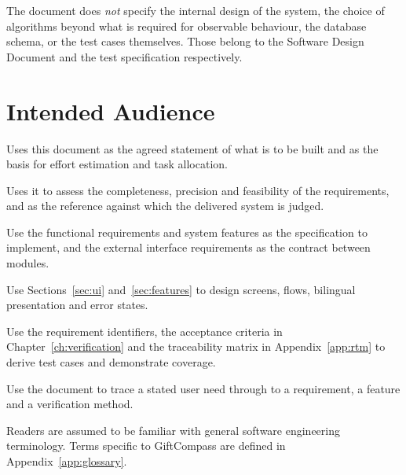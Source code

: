 \documentclass[11pt,a4paper]{report}
\begin{document}
\noindent The document does \emph{not} specify the internal design of the system, the choice
of algorithms beyond what is required for observable behaviour, the database schema, or the
test cases themselves. Those belong to the Software Design Document and the test
specification respectively.

\section{Intended Audience}
\begin{description}[style=nextline,leftmargin=0pt]
  \item[Project team] Uses this document as the agreed statement of what is to be built and
        as the basis for effort estimation and task allocation.
  \item[Instructor and project supervisor] Uses it to assess the completeness, precision and
        feasibility of the requirements, and as the reference against which the delivered
        system is judged.
  \item[Developers] Use the functional requirements and system features as the specification
        to implement, and the external interface requirements as the contract between modules.
  \item[UI/UX designers] Use Sections~\ref{sec:ui} and~\ref{sec:features} to design screens,
        flows, bilingual presentation and error states.
  \item[Testers] Use the requirement identifiers, the acceptance criteria in
        Chapter~\ref{ch:verification} and the traceability matrix in Appendix~\ref{app:rtm}
        to derive test cases and demonstrate coverage.
  \item[Project evaluators] Use the document to trace a stated user need through to a
        requirement, a feature and a verification method.
\end{description}

\noindent Readers are assumed to be familiar with general software engineering terminology.
Terms specific to GiftCompass are defined in Appendix~\ref{app:glossary}.
\end{document}
